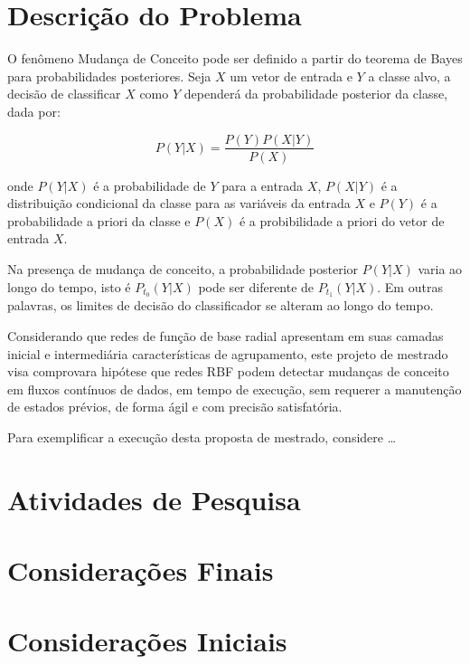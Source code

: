 \documentclass[qual, classic, a4paper]{ufbathesis}
\begin{document}
\section{Descrição do Problema}

O fenômeno Mudança de Conceito pode ser definido a partir do teorema de Bayes para probabilidades posteriores.
Seja $X$ um vetor de entrada e $Y$ a classe alvo,
a decisão de classificar $X$ como $Y$ dependerá da probabilidade posterior da classe, dada por:

\begin{equation} \label{eq:gaussiana}
    P(Y |X) = \frac{P(Y)P(X|Y)}{P(X)}
\end{equation}

onde $P(Y|X)$ é a probabilidade de $Y$ para a entrada $X$, $P(X|Y)$ é a distribuição condicional da classe para as variáveis da entrada $X$ e 
$P(Y)$ é a probabilidade a priori da classe e $P(X)$ é a probibilidade a priori do vetor de entrada $X$.

Na presença de mudança de conceito, a probabilidade posterior $P(Y|X)$ varia ao longo do tempo, isto é $P_{t_0}(Y|X)$ pode ser diferente de $P_{t_1}(Y|X)$.
Em outras palavras, os limites de decisão do classificador se alteram ao longo do tempo.

Considerando que redes de função de base radial apresentam em suas camadas inicial e intermediária características de agrupamento, 
este projeto de mestrado visa comprovara hipótese que redes RBF podem detectar mudanças de conceito em fluxos contínuos de dados, 
em tempo de execução, sem requerer a manutenção de estados prévios, de forma ágil e com precisão satisfatória.

Para exemplificar a execução desta proposta de mestrado, considere \ldots


\section{Atividades de Pesquisa}
\blindtext

\section{Considerações Finais}
\blindtext

 \label{experimentos_iniciais}
\section{Considerações Iniciais}
\blindtext
\end{document}
